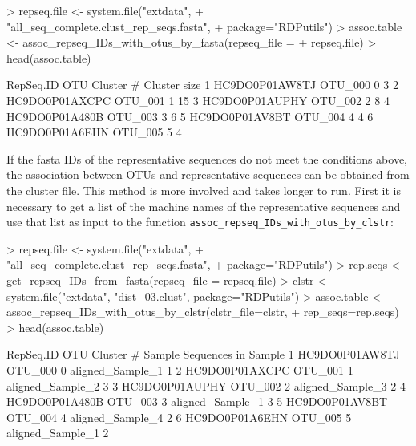 \documentclass{article}
\begin{document}
\begin{Schunk}
\begin{Sinput}
> repseq.file <- system.file("extdata", 
+                "all_seq_complete.clust_rep_seqs.fasta", 
+                 package="RDPutils")
> assoc.table <- assoc_repseq_IDs_with_otus_by_fasta(repseq_file = 
+                                                      repseq.file)
> head(assoc.table)
\end{Sinput}
\begin{Soutput}
       RepSeq.ID     OTU Cluster # Cluster size
1 HC9DO0P01AW8TJ OTU_000         0            3
2 HC9DO0P01AXCPC OTU_001         1           15
3 HC9DO0P01AUPHY OTU_002         2            8
4 HC9DO0P01A480B OTU_003         3            6
5 HC9DO0P01AV8BT OTU_004         4            4
6 HC9DO0P01A6EHN OTU_005         5            4
\end{Soutput}
\end{Schunk}
If the fasta IDs of the representative sequences do not meet the conditions above, the association between OTUs and representative sequences can be obtained from the cluster file.  This method is more involved and takes longer to run.  First it is necessary to get a list of the machine names of the representative sequences and use that list as input to  the function \texttt{assoc\_repseq\_IDs\_with\_otus\_by\_clstr}:
\begin{Schunk}
\begin{Sinput}
> repseq.file <- system.file("extdata", 
+                            "all_seq_complete.clust_rep_seqs.fasta", 
+                            package="RDPutils")
> rep.seqs <- get_repseq_IDs_from_fasta(repseq_file = repseq.file)
> clstr <- system.file("extdata", "dist_03.clust", package="RDPutils")
> assoc.table <- assoc_repseq_IDs_with_otus_by_clstr(clstr_file=clstr, 
+                                                    rep_seqs=rep.seqs)
> head(assoc.table)
\end{Sinput}
\begin{Soutput}
       RepSeq.ID     OTU Cluster #           Sample Sequences in Sample
1 HC9DO0P01AW8TJ OTU_000         0 aligned_Sample_1                   1
2 HC9DO0P01AXCPC OTU_001         1 aligned_Sample_2                   3
3 HC9DO0P01AUPHY OTU_002         2 aligned_Sample_3                   2
4 HC9DO0P01A480B OTU_003         3 aligned_Sample_1                   3
5 HC9DO0P01AV8BT OTU_004         4 aligned_Sample_4                   2
6 HC9DO0P01A6EHN OTU_005         5 aligned_Sample_1                   2
\end{Soutput}
\end{Schunk}
\end{document}
